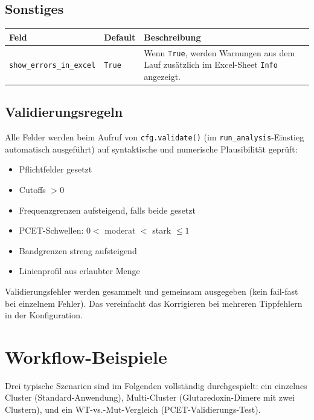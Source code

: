 \documentclass[11pt,a4paper,twoside]{article}
\theoremstyle{remark}
\begin{document}
\subsection{Sonstiges}

\begin{longtable}{p{} p{} p{}}
\toprule
\textbf{Feld} & \textbf{Default} & \textbf{Beschreibung} \\
\midrule
\endhead
\texttt{show\_errors\_in\_excel} & \texttt{True} & Wenn \texttt{True},
  werden Warnungen aus dem Lauf zus\"atzlich im Excel-Sheet
  \texttt{Info} angezeigt. \\
\bottomrule
\end{longtable}

\subsection{Validierungsregeln}

Alle Felder werden beim Aufruf von \texttt{cfg.validate()} (im
\texttt{run\_analysis}-Einstieg automatisch ausgef\"uhrt) auf
syntaktische und numerische Plausibilit\"at gepr\"uft:

\begin{itemize}
  \item Pflichtfelder gesetzt
  \item Cutoffs $> 0$
  \item Frequenzgrenzen aufsteigend, falls beide gesetzt
  \item PCET-Schwellen: $0 < $ moderat $< $ stark $\leq 1$
  \item Bandgrenzen streng aufsteigend
  \item Linienprofil aus erlaubter Menge
\end{itemize}

Validierungsfehler werden gesammelt und gemeinsam ausgegeben (kein
fail-fast bei einzelnem Fehler). Das vereinfacht das Korrigieren bei
mehreren Tippfehlern in der Konfiguration.

\section{Workflow-Beispiele}
\label{sec:workflow}

Drei typische Szenarien sind im Folgenden vollst\"andig durchgespielt:
ein einzelnes Cluster (Standard-Anwendung), Multi-Cluster (Glutaredoxin-Dimere mit zwei
Clustern), und ein WT-vs.-Mut-Vergleich (PCET-Validierungs-Test).
\end{document}
